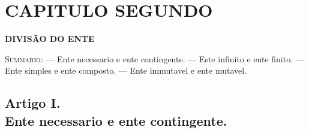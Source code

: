 


\chapter*{CAPITULO SEGUNDO}

\textbf{DIVISÃO DO ENTE}

\textsc{Summario}: --- Ente necessario e ente contingente. --- Este infinito e ente finito. --- Ente simples e ente composto. --- Ente immutavel e ente mutavel.


\section*{Artigo I.\\ Ente necessario e ente contingente.}

